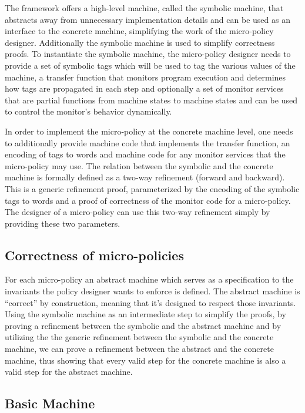 The framework offers a high-level machine, called the symbolic machine, that
abstracts away from unnecessary implementation details and can be used as an 
interface to the concrete machine, simplifying the work of the micro-policy 
designer. Additionally the symbolic machine is used to simplify correctness 
proofs. To instantiate the symbolic machine, the micro-policy designer needs to
provide a set of symbolic tags which will be used to tag the various values of
the machine, a transfer function that monitors program execution and determines
how tags are propagated in each step and optionally a set of monitor services 
that are partial functions from machine states to machine states and can be used
to control the monitor's behavior dynamically.

In order to implement the micro-policy at the concrete machine level, one needs
to additionally provide machine code that implements the transfer function, an
encoding of tags to words and machine code for any monitor services that the
micro-policy may use. The relation between the symbolic and the concrete machine
is formally defined as a two-way refinement (forward and backward). This is a 
generic refinement proof, parameterized by the encoding of the symbolic tags to
words and a proof of correctness of the monitor code for a micro-policy.
The designer of a micro-policy can use this two-way refinement simply by
providing these two parameters.

\subsection{Correctness of micro-policies}\label{sec:verification}

For each micro-policy an abstract machine which serves as a specification to the
invariants the policy designer wants to enforce is defined. The abstract machine 
is ``correct'' by construction, meaning that it's designed to respect those 
invariants. Using the symbolic machine as an intermediate step to simplify the
proofs, by proving a refinement between the symbolic and the abstract machine 
and by utilizing the the generic refinement between the symbolic and the
concrete machine, we can prove a refinement between the abstract and
the concrete machine, thus showing that every valid step for the concrete
machine is also a valid step for the abstract machine. 

\subsection{Basic Machine}\label{sec:basic}

